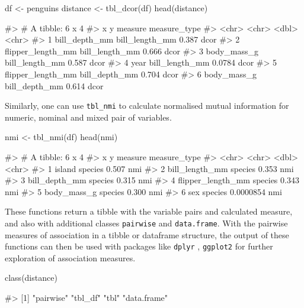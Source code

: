 \begin{Schunk}
\begin{Sinput}
df <- penguins
distance <- tbl_dcor(df)
head(distance)
\end{Sinput}
\begin{Soutput}
#> # A tibble: 6 x 4
#>   x                 y              measure measure_type
#>   <chr>             <chr>            <dbl> <chr>       
#> 1 bill_depth_mm     bill_length_mm  0.387  dcor        
#> 2 flipper_length_mm bill_length_mm  0.666  dcor        
#> 3 body_mass_g       bill_length_mm  0.587  dcor        
#> 4 year              bill_length_mm  0.0784 dcor        
#> 5 flipper_length_mm bill_depth_mm   0.704  dcor        
#> 6 body_mass_g       bill_depth_mm   0.614  dcor
\end{Soutput}
\end{Schunk}

Similarly, one can use \texttt{tbl\_nmi} to calculate normalised mutual
information for numeric, nominal and mixed pair of variables.

\begin{Schunk}
\begin{Sinput}
nmi <- tbl_nmi(df)
head(nmi)
\end{Sinput}
\begin{Soutput}
#> # A tibble: 6 x 4
#>   x                 y         measure measure_type
#>   <chr>             <chr>       <dbl> <chr>       
#> 1 island            species 0.507     nmi         
#> 2 bill_length_mm    species 0.353     nmi         
#> 3 bill_depth_mm     species 0.315     nmi         
#> 4 flipper_length_mm species 0.343     nmi         
#> 5 body_mass_g       species 0.300     nmi         
#> 6 sex               species 0.0000854 nmi
\end{Soutput}
\end{Schunk}

These functions return a tibble with the variable pairs and calculated
measure, and also with additional classes \texttt{pairwise} and
\texttt{data.frame}. With the pairwise measures of association in a
tibble or dataframe structure, the output of these functions can then be
used with packages like \texttt{dplyr} , \texttt{ggplot2} for further
exploration of association measures.

\begin{Schunk}
\begin{Sinput}
class(distance)
\end{Sinput}
\begin{Soutput}
#> [1] "pairwise"   "tbl_df"     "tbl"        "data.frame"
\end{Soutput}
\end{Schunk}

